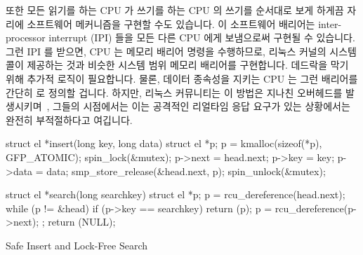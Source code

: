 \fi

또한 모든 읽기를 하는 CPU 가 쓰기를 하는 CPU 의 쓰기를 순서대로 보게 하게끔
 자리에 소프트웨어 메커니즘을 구현할 수도 있습니다.
이 소프트웨어 배리어는 inter-processor interrupt (IPI) 들을 모든 다른 CPU 에게
보냄으로써 구현될 수 있습니다.
그런 IPI 를 받으면, CPU 는 메모리 배리어 명령을 수행하므로, 리눅스 커널의
 시스템콜이 제공하는 것과 비슷한 시스템 범위 메모리
배리어를 구현합니다.
데드락을 막기 위해 추가적 로직이 필요합니다.
물론, 데이터 종속성을 지키는 CPU 는 그런 배리어를 간단히
 로 정의할 겁니다.
하지만, 리눅스 커뮤니티는 이 방법은 지나친 오버헤드를
발생시키며~\cite{McKenney01f}, 그들의 시점에서는 이는 공격적인 리얼타임 응답
요구가 있는 상황에서는 완전히 부적절하다고 여깁니다.

\begin{listing}[tbp]
\begin{fcvlabel}
\begin{VerbatimL}[commandchars=\\\[\]]
struct el *insert(long key, long data)
{
	struct el *p;
	p = kmalloc(sizeof(*p), GFP_ATOMIC);
	spin_lock(&mutex);
	p->next = head.next;
	p->key = key;
	p->data = data;
	smp_store_release(&head.next, p);
	spin_unlock(&mutex);
}

struct el *search(long searchkey)
{
	struct el *p;
	p = rcu_dereference(head.next);		\lnlbl[deref1]
	while (p != &head) {
		if (p->key == searchkey) {
			return (p);
		}
		p = rcu_dereference(p->next);	\lnlbl[deref2]
	};
	return (NULL);
}
\end{VerbatimL}
\end{fcvlabel}
\caption{Safe Insert and Lock-Free Search}
\label{lst:memorder:Safe Insert and Lock-Free Search}
\end{listing}

